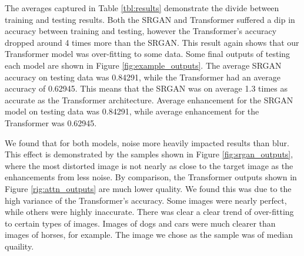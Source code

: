 \documentclass[letterpaper]{article} %
\begin{document}
The averages captured in Table \ref{tbl:results} demonstrate the divide between training and testing results.
Both the SRGAN and Transformer suffered a dip in accuracy between training and testing,
however the Transformer's accuracy dropped around 4 times more than the SRGAN.
This result again shows that our Transformer model was over-fitting to some data.
Some final outputs of testing each model are shown in Figure \ref{fig:example_outputs}.
The average SRGAN accuracy on testing data was 0.84291,
while the Transformer had an average accuracy of 0.62945.
This means that the SRGAN was on average 1.3 times as accurate as the Transformer architecture.
Average enhancement for the SRGAN model on testing data was 0.84291,
while average enhancement for the Transformer was 0.62945.

We found that for both models, noise more heavily impacted results than blur.
This effect is demonstrated by the samples shown in Figure \ref{fig:srgan_outputs},
where the most distorted image is not nearly as close to the target image as the enhancements from less noise.
By comparison, the Transformer outputs shown in Figure \ref{rig:attn_outputs}
are much lower quality.
We found this was due to the high variance of the Transformer's accuracy.
Some images were nearly perfect, while others were highly inaccurate.
There was clear a clear trend of over-fitting to certain types of images.
Images of dogs and cars were much clearer than images of horses, for example.
The image we chose as the sample was of median quaility.
\end{document}

